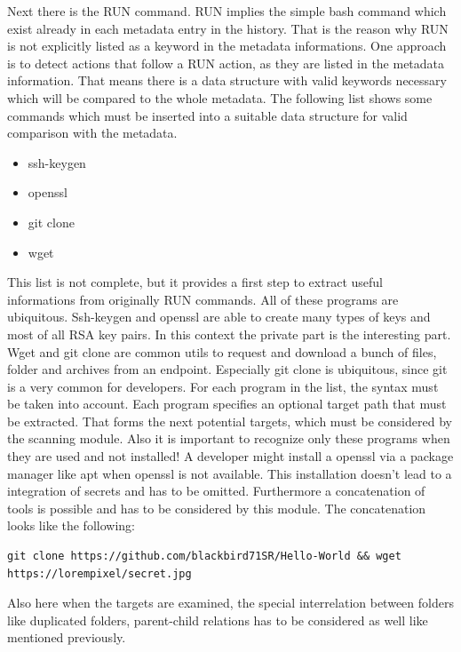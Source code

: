 Next there is the RUN command. RUN implies the simple bash command which exist already in each metadata entry in the history. That is the reason why RUN is not explicitly listed as a keyword in the metadata informations. 
One approach is to detect actions that follow a RUN action, as they are listed in the metadata information. That means there is a data structure with valid keywords necessary which will be compared to the whole metadata.
The following list shows some commands which must be inserted into a suitable data structure for valid comparison with the metadata.
\begin{itemize}
\item ssh-keygen
\item openssl
\item git clone
\item wget
\end{itemize}
This list is not complete, but it provides a first step to extract useful informations from originally RUN commands. All of these programs are ubiquitous.
Ssh-keygen and openssl are able to create many types of keys and most of all RSA key pairs. In this context the private part is the interesting part.
Wget and git clone are common utils to request and download a bunch of files, folder and archives from an endpoint. Especially git clone is ubiquitous, since git is a very common for developers.
For each program in the list, the syntax must be taken into account. Each program specifies an optional target path that must be extracted. That forms the next potential targets, which must be considered by the scanning module.
Also it is important to recognize only these programs when they are used and not installed! A developer might install a openssl via a package manager like apt when openssl is not available.
This installation doesn't lead to a integration of secrets and has to be omitted.
Furthermore a concatenation of tools is possible and has to be considered by this module. The concatenation looks like the following:
\begin{lstlisting}
git clone https://github.com/blackbird71SR/Hello-World && wget https://lorempixel/secret.jpg
\end{lstlisting}

Also here when the targets are examined, the special interrelation between folders like duplicated folders, parent-child relations has to be considered as well like mentioned previously.

